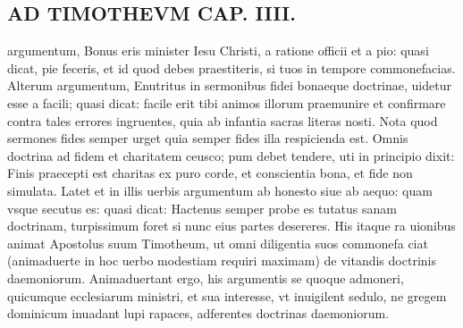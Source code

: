 \documentclass{article}
\begin{document}
\begin{pages}
\section*{AD TIMOTHEVM CAP. IIII. }
\marginpar{[ p.95 ]}\pstart argumentum, Bonus eris minister Iesu Christi, a ratione officii et a pio: quasi dicat, pie feceris, et id quod debes praestiteris, si tuos in tempore commonefacias. Alterum argumentum, Enutritus in sermonibus fidei bonaeque doctrinae, uidetur esse a facili; quasi dicat: facile erit tibi animos illorum praemunire et confirmare contra tales errores ingruentes, quia ab infantia sacras literas nosti. Nota quod sermones fides semper urget quia semper fides illa respicienda est. Omnis doctrina ad fidem et charitatem ceusco; pum debet tendere, uti in principio dixit: Finis praecepti est charitas ex puro corde, et conscientia bona, et fide non simulata. Latet et in illis uerbis argumentum ab honesto siue ab aequo: quam vsque secutus es: quasi dicat: Hactenus semper probe es tutatus sanam doctrinam, turpissimum foret si nunc eius partes desereres. His itaque ra uionibus animat Apostolus suum Timotheum, ut omni diligentia suos commonefa ciat (animaduerte in hoc uerbo modestiam requiri maximam) de vitandis doctrinis daemoniorum. Animaduertant ergo, his argumentis se quoque admoneri, quicumque ecclesiarum ministri, et sua interesse, vt inuigilent sedulo, ne gregem dominicum inuadant lupi rapaces, adferentes doctrinas daemoniorum.  \pend
{}
{}

\end{pages}
\end{document}
